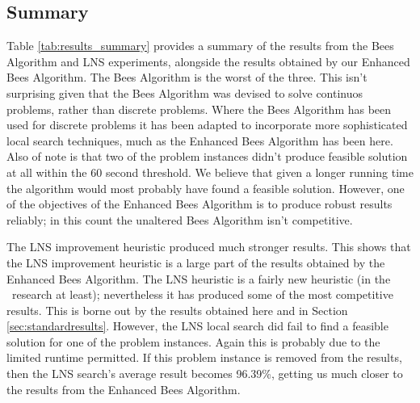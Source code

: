 \subsection{Summary}

Table \ref{tab:results_summary} provides a summary of the results from the Bees Algorithm and LNS experiments, alongside the results obtained by our Enhanced Bees Algorithm. The Bees Algorithm is the worst of the three. This isn't surprising given that the Bees Algorithm was devised to solve continuos problems, rather than discrete problems. Where the Bees Algorithm has been used for discrete problems it has been adapted to incorporate more sophisticated local search techniques, much as the Enhanced Bees Algorithm has been here. Also of note is that two of the problem instances didn't produce feasible solution at all within the 60 second threshold. We believe that given a longer running time the algorithm would most probably have found a feasible solution. However, one of the objectives of the Enhanced Bees Algorithm is to produce robust results reliably; in this count the unaltered Bees Algorithm isn't competitive. 

The LNS improvement heuristic produced much stronger results. This shows that the LNS improvement heuristic is a large part of the results obtained by the Enhanced Bees Algorithm. The LNS heuristic is a fairly new heuristic (in the \VRP\ research at least); nevertheless it has produced some of the most competitive results. This is borne out by the results obtained here and in Section \ref{sec:standardresults}. However, the LNS local search did fail to find a feasible solution for one of the problem instances. Again this is probably due to the limited runtime permitted. If this problem instance is removed from the results, then the LNS search's average result becomes 96.39\%, getting us much closer to the results from the Enhanced Bees Algorithm.

